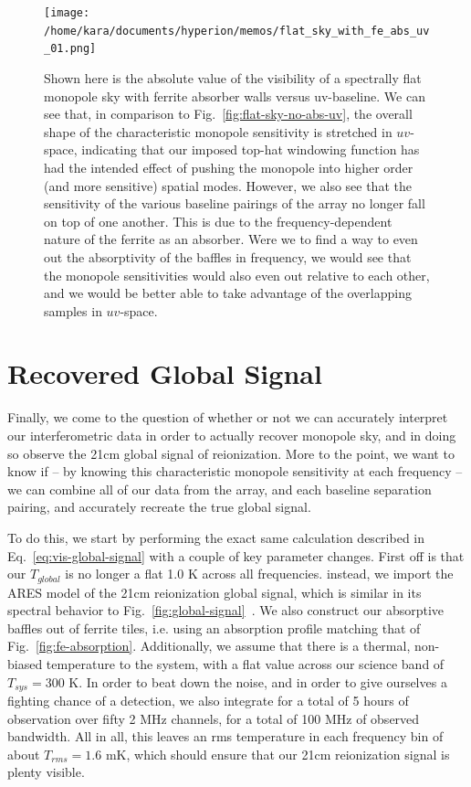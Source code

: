 \begin{figure}
    \begin{center}
    \texttt{[image: /home/kara/documents/hyperion/memos/flat\_sky\_with\_fe\_abs\_uv\_01.png]}
    \end{center}
    \caption{
        Shown here is the absolute value of the visibility of a spectrally flat 
        monopole sky with ferrite absorber walls versus uv-baseline. We can see 
        that, in comparison to Fig.~\ref{fig:flat-sky-no-abs-uv}, the overall 
        shape of the characteristic monopole sensitivity is stretched in 
        $uv$-space, indicating that our imposed top-hat windowing function has 
        had the intended effect of pushing the monopole into higher order (and 
        more sensitive) spatial modes. However, we also see that the 
        sensitivity of the various baseline pairings of the array no longer 
        fall on top of one another. This is due to the frequency-dependent 
        nature of the ferrite as an absorber. Were we to find a way to even out 
        the absorptivity of the baffles in frequency, we would see that the 
        monopole sensitivities would also even out relative to each other, and 
        we would be better able to take advantage of the overlapping samples in 
        $uv$-space.
    }
    \label{fig:flat-sky-fe-abs-uv}
\end{figure}

\section{Recovered Global Signal}

Finally, we come to the question of whether or not we can accurately interpret 
our interferometric data in order to actually recover monopole sky, and in 
doing so observe the 21cm global signal of reionization. More to the point, we 
want to know if -- by knowing this characteristic monopole sensitivity at each 
frequency -- we can combine all of our data from the array, and each baseline 
separation pairing, and accurately recreate the true global signal.

To do this, we start by performing the exact same calculation described in 
Eq.~\eqref{eq:vis-global-signal} with a couple of key parameter changes. First 
off is that our $T_{global}$ is no longer a flat 1.0 K across all frequencies.  
instead, we import the ARES model of the 21cm reionization global signal, which 
is similar in its spectral behavior to 
Fig.~\ref{fig:global-signal}~\citep{mirocha2014}. We also construct our 
absorptive baffles out of ferrite tiles, i.e. using an absorption profile 
matching that of Fig.~\ref{fig:fe-absorption}. Additionally, we assume that 
there is a thermal, non-biased temperature to the system, with a flat value 
across our science band of $T_{sys} = 300$ K.  In order to beat down the noise, 
and in order to give ourselves a fighting chance of a detection, we also 
integrate for a total of 5 hours of observation over fifty 2 MHz channels, for 
a total of 100 MHz of observed bandwidth. All in all, this leaves an rms 
temperature in each frequency bin of about $T_{rms} = 
1.6$ mK, which should ensure that our 21cm reionization signal is plenty 
  visible. 

